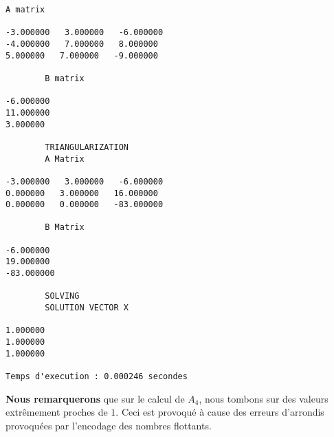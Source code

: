 \begin{lstlisting}[caption={$A_6X=B$} results, basicstyle=\fontsize{4}{6}\selectfont]
		A matrix 

-3.000000   3.000000   -6.000000   
-4.000000   7.000000   8.000000   
5.000000   7.000000   -9.000000   

		B matrix 

-6.000000   
11.000000   
3.000000   

		TRIANGULARIZATION 
		A Matrix 

-3.000000   3.000000   -6.000000   
0.000000   3.000000   16.000000   
0.000000   0.000000   -83.000000   

		B Matrix 

-6.000000   
19.000000   
-83.000000   

		SOLVING 
		SOLUTION VECTOR X 

1.000000   
1.000000   
1.000000   

Temps d'execution : 0.000246 secondes
\end{lstlisting}

\textbf{Nous remarquerons} que sur le calcul de $A_4$, nous tombons sur des valeurs extrêmement proches de $1$. Ceci est provoqué à cause des erreurs d'arrondis provoquées par l'encodage des nombres flottants.     